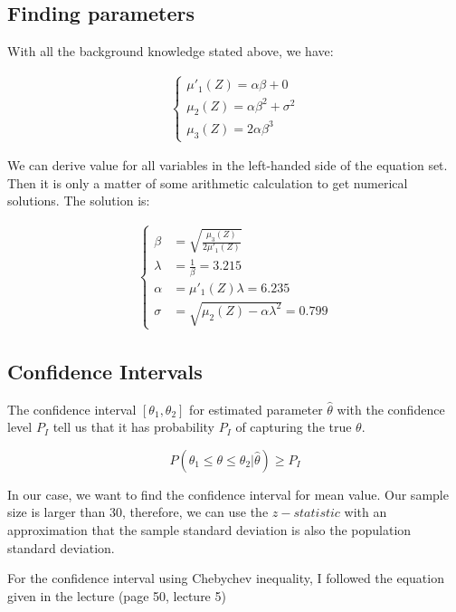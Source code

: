 \documentclass[conference]{IEEEtran}
\begin{document}
\subsection{Finding parameters}
With all the background knowledge stated above, we have:

\begin{align}
\begin{cases}
\mu'_{1}(Z) = \alpha \beta + 0 \\
\mu_{2}(Z) = \alpha \beta^2 + \sigma^2 \\
\mu_{3}(Z) = 2 \alpha \beta^3
\end{cases}
\end{align}

We can derive value for all variables in the left-handed side of the equation set. Then it is only a matter of some arithmetic calculation to get numerical solutions. The solution is:

\begin{align*}
\begin{cases}
\beta &= \sqrt{\frac{\mu_{3}(Z)}{2\mu'_{1}(Z)}}\\
\lambda &= \frac{1}{\beta} = 3.215 \\
\alpha &= \mu'_{1}(Z) \lambda = 6.235 \\
\sigma &= \sqrt{\mu_{2}(Z) - \alpha \lambda ^ 2} = 0.799
\end{cases}
\end{align*}

\subsection{Confidence Intervals}
The confidence interval $[\theta_1, \theta_2]$ for estimated parameter $\hat{\theta}$ with the confidence level $P_I$ tell us that it has probability $P_I$ of capturing the true $\theta$.

\begin{equation}
P(\theta_1 \leq \theta \leq \theta_2 | \hat{\theta}) \geq P_I
\end{equation}

In our case, we want to find the confidence interval for mean value. Our sample size is larger than 30, therefore, we can use the $z-statistic$ with an approximation that the sample standard deviation is also the population standard deviation.

For the confidence interval using Chebychev inequality, I followed the equation given in the lecture (page 50, lecture 5)
\end{document}
